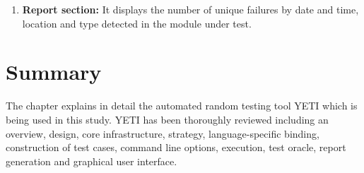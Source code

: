 \begin{enumerate}
\item \textbf{Report section:} It displays the number of unique failures by date and time, location and type detected in the module under test. 
\end{enumerate}


\section{Summary}
The chapter explains in detail the automated random testing tool YETI which is being used in this study. YETI has been thoroughly reviewed including an overview, design, core infrastructure, strategy, language-specific binding, construction of test cases, command line options, execution, test oracle, report generation and graphical user interface.


